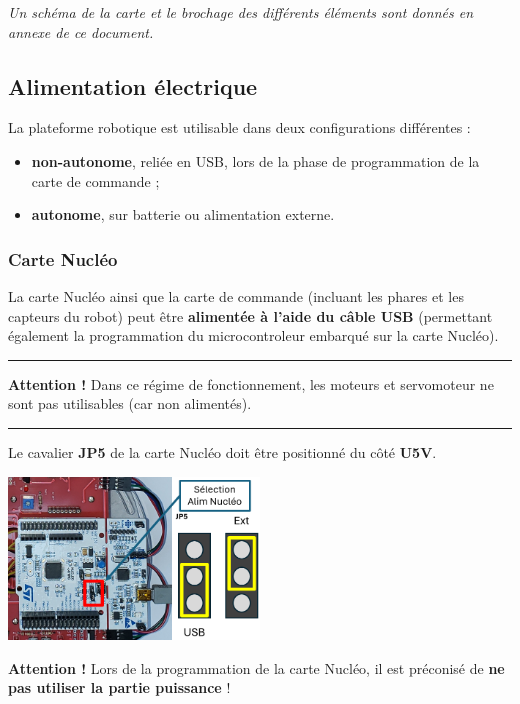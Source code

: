 \documentclass[a4paper,11pt,titlepage]{article} %
\begin{document}
\textit{Un schéma de la carte et le brochage des différents éléments sont donnés en annexe de ce document.}

\newpage
\subsection{Alimentation électrique}

La plateforme robotique est utilisable dans deux configurations différentes :
\begin{itemize}
	\item \textbf{non-autonome}, reliée en USB, lors de la phase de programmation de la carte de commande ;
	\item \textbf{autonome}, sur batterie ou alimentation externe.
\end{itemize}

\subsubsection{Carte Nucléo}

La carte Nucléo ainsi que la carte de commande (incluant les phares et les capteurs du robot) peut être \textbf{alimentée à l'aide du câble USB} (permettant également la programmation du microcontroleur embarqué sur la carte Nucléo).


\noindent \rule{\linewidth}{1pt}

\textbf{Attention !} Dans ce régime de fonctionnement, les moteurs et servomoteur ne sont pas utilisables (car non alimentés).

\noindent \rule{\linewidth}{1pt}

Le cavalier \textbf{JP5} de la carte Nucléo doit être positionné du côté \textbf{U5V}.

\begin{center}
	\includegraphics[width=0.5\textwidth]{images/nuc_alim.png}
\end{center}

\textbf{Attention !} Lors de la programmation de la carte Nucléo, il est préconisé de \textbf{ne pas utiliser la partie puissance} !
\end{document}
